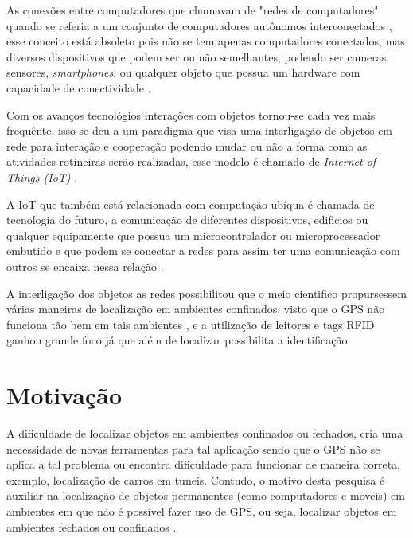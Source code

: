 
As  conexões entre computadores que chamavam de 
"redes de computadores" quando se referia a um conjunto de computadores autônomos interconectados \cite{tenenbaum2002}, 
esse conceito está absoleto pois não se tem apenas computadores conectados, mas diversos dispositivos que podem ser ou 
não semelhantes, podendo ser cameras, sensores, \textit{smartphones}, ou qualquer objeto que possua um 
hardware com capacidade de conectividade \cite{iot2016SBRC}.


Com os avanços tecnológios interações com objetos tornou-se cada vez mais frequênte, isso se deu a um paradigma 
que visa uma interligação de objetos em rede para interação e cooperação podendo mudar ou não a forma como as atividades 
rotineiras serão realizadas, esse modelo é chamado de \textit{Internet of Things (IoT)} \cite{realtimeRFID2016}.


A IoT que também está relacionada com computação ubíqua é chamada de tecnologia do futuro, a comunicação de diferentes dispositivos, 
edificios ou qualquer equipamente que possua um microcontrolador ou microprocessador embutido e que podem se conectar a 
redes para assim ter uma comunicação com outros se encaixa nessa relação \cite{mechanismRFID2006}.


A interligação dos objetos as redes possibilitou que o meio cientifico propursessem várias maneiras de localização em ambientes 
confinados, visto que o GPS não funciona tão bem em tais ambientes \cite{mechanismRFID2006}, e a utilização de leitores e tags RFID 
ganhou grande foco já que além de localizar possibilita a identificação.


 \section{Motivação}
A dificuldade de localizar objetos em ambientes confinados ou fechados, cria uma necessidade de novas ferramentas para 
tal aplicação sendo que o GPS não se aplica a tal problema ou encontra dificuldade para funcionar de maneira correta, exemplo, 
localização de carros em tuneis. Contudo, o motivo desta pesquisa é auxiliar na localização de objetos permanentes (como computadores e moveis) 
em ambientes em que não é possível fazer uso de GPS, 
ou seja, localizar objetos em ambientes fechados ou confinados \cite{mechanismRFID2006}.

